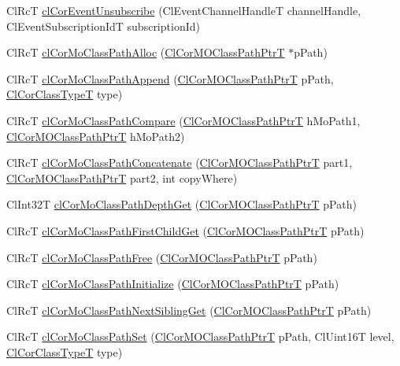 \begin{CompactItemize}
\item 
Cl\-Rc\-T \hyperlink{group__group13_ga64}{cl\-Cor\-Event\-Unsubscribe} (Cl\-Event\-Channel\-Handle\-T channel\-Handle, Cl\-Event\-Subscription\-Id\-T subscription\-Id)
\item 
Cl\-Rc\-T \hyperlink{group__group13_ga96}{cl\-Cor\-Mo\-Class\-Path\-Alloc} (\hyperlink{struct_cl_cor_m_o_class_path}{Cl\-Cor\-MOClass\-Path\-Ptr\-T} $\ast$p\-Path)
\item 
Cl\-Rc\-T \hyperlink{group__group13_ga100}{cl\-Cor\-Mo\-Class\-Path\-Append} (\hyperlink{struct_cl_cor_m_o_class_path}{Cl\-Cor\-MOClass\-Path\-Ptr\-T} p\-Path, \hyperlink{group__group13_ga2}{Cl\-Cor\-Class\-Type\-T} type)
\item 
Cl\-Rc\-T \hyperlink{group__group13_ga105}{cl\-Cor\-Mo\-Class\-Path\-Compare} (\hyperlink{struct_cl_cor_m_o_class_path}{Cl\-Cor\-MOClass\-Path\-Ptr\-T} h\-Mo\-Path1, \hyperlink{struct_cl_cor_m_o_class_path}{Cl\-Cor\-MOClass\-Path\-Ptr\-T} h\-Mo\-Path2)
\item 
Cl\-Rc\-T \hyperlink{group__group13_ga106}{cl\-Cor\-Mo\-Class\-Path\-Concatenate} (\hyperlink{struct_cl_cor_m_o_class_path}{Cl\-Cor\-MOClass\-Path\-Ptr\-T} part1, \hyperlink{struct_cl_cor_m_o_class_path}{Cl\-Cor\-MOClass\-Path\-Ptr\-T} part2, int copy\-Where)
\item 
Cl\-Int32T \hyperlink{group__group13_ga101}{cl\-Cor\-Mo\-Class\-Path\-Depth\-Get} (\hyperlink{struct_cl_cor_m_o_class_path}{Cl\-Cor\-MOClass\-Path\-Ptr\-T} p\-Path)
\item 
Cl\-Rc\-T \hyperlink{group__group13_ga103}{cl\-Cor\-Mo\-Class\-Path\-First\-Child\-Get} (\hyperlink{struct_cl_cor_m_o_class_path}{Cl\-Cor\-MOClass\-Path\-Ptr\-T} p\-Path)
\item 
Cl\-Rc\-T \hyperlink{group__group13_ga97}{cl\-Cor\-Mo\-Class\-Path\-Free} (\hyperlink{struct_cl_cor_m_o_class_path}{Cl\-Cor\-MOClass\-Path\-Ptr\-T} p\-Path)
\item 
Cl\-Rc\-T \hyperlink{group__group13_ga95}{cl\-Cor\-Mo\-Class\-Path\-Initialize} (\hyperlink{struct_cl_cor_m_o_class_path}{Cl\-Cor\-MOClass\-Path\-Ptr\-T} p\-Path)
\item 
Cl\-Rc\-T \hyperlink{group__group13_ga104}{cl\-Cor\-Mo\-Class\-Path\-Next\-Sibling\-Get} (\hyperlink{struct_cl_cor_m_o_class_path}{Cl\-Cor\-MOClass\-Path\-Ptr\-T} p\-Path)
\item 
Cl\-Rc\-T \hyperlink{group__group13_ga99}{cl\-Cor\-Mo\-Class\-Path\-Set} (\hyperlink{struct_cl_cor_m_o_class_path}{Cl\-Cor\-MOClass\-Path\-Ptr\-T} p\-Path, Cl\-Uint16T level, \hyperlink{group__group13_ga2}{Cl\-Cor\-Class\-Type\-T} type)

\end{CompactItemize}

